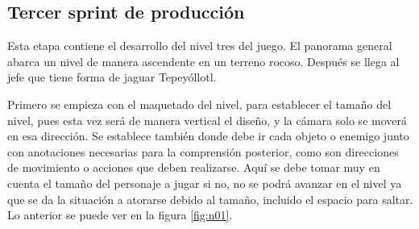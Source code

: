 
\subsection{Tercer sprint de producción}
Esta etapa contiene el desarrollo del nivel tres del juego. El panorama general abarca un nivel de manera ascendente en un terreno rocoso. Después se llega al jefe que tiene forma de jaguar Tepeyóllotl.

Primero se empieza con el maquetado del nivel, para establecer el tamaño del nivel, pues esta vez será de manera vertical el diseño, y la cámara solo se moverá en esa dirección. Se establece también donde debe ir cada objeto o enemigo junto con anotaciones necesarias para la comprensión posterior, como son direcciones de movimiento o acciones que deben realizarse. Aquí se debe tomar muy en cuenta el tamaño del personaje a jugar si no, no se podrá avanzar en el nivel ya que se da la situación a atorarse debido al tamaño, incluido el espacio para saltar. Lo anterior se puede ver en la figura \ref{fig:n01}.
